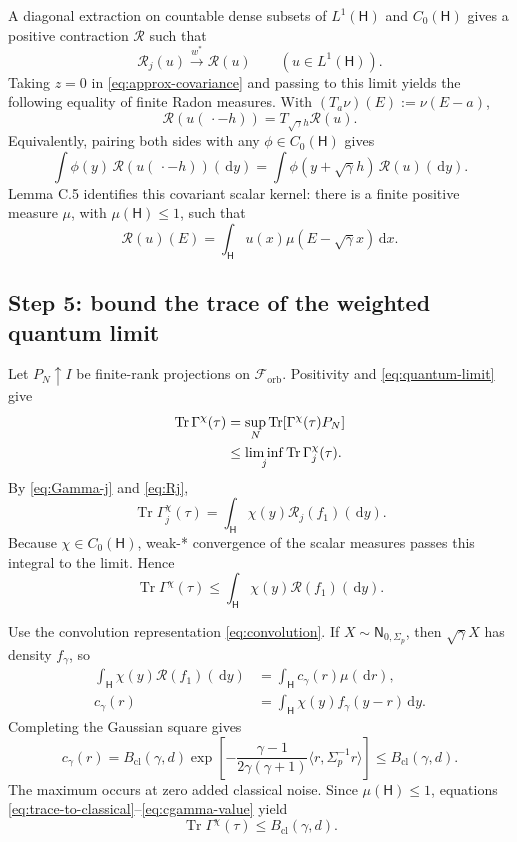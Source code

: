 \documentclass[11pt]{article}
\newcommand{\Hc}{\mathsf H}
\newcommand{\F}{\mathcal F_{\mathrm{orb}}}
\newcommand{\Tr}{\operatorname{Tr}}
\newcommand{\dd}{\,\mathrm d}
\newcommand{\Bcl}{B_{\mathrm{cl}}}
\begin{document}
A diagonal extraction on countable dense subsets of $L^1(\Hc)$ and
$C_0(\Hc)$ gives a positive contraction $\mathcal R$ such that
\[
  \mathcal R_j(u)\stackrel{w^*}{\longrightarrow}\mathcal R(u)
  \qquad(u\in L^1(\Hc)).
\]
Taking $z=0$ in \eqref{eq:approx-covariance} and passing to this limit yields
the following equality of finite Radon measures.  With
$(T_a\nu)(E):=\nu(E-a)$,
\begin{equation}\label{eq:R-covariance}
  \mathcal R(u(\,\cdot-h))
  =T_{\sqrt\gamma h}\mathcal R(u).
\end{equation}
Equivalently, pairing both sides with any $\phi\in C_0(\Hc)$ gives
\[
  \int\phi(y)\,\mathcal R(u(\,\cdot-h))(\dd y)
  =\int\phi(y+\sqrt\gamma h)\,\mathcal R(u)(\dd y).
\]
Lemma C.5 identifies this covariant scalar kernel: there is a finite positive
measure $\mu$, with $\mu(\Hc)\leq1$, such that
\begin{equation}\label{eq:convolution}
  \mathcal R(u)(E)
  =\int_{\Hc}u(x)\mu(E-\sqrt\gamma x)\dd x.
\end{equation}

\subsection*{Step 5: bound the trace of the weighted quantum limit}

Let $P_N\uparrow I$ be finite-rank projections on $\F$.  Positivity and
\eqref{eq:quantum-limit} give
\begin{align}
  \Tr\Gamma^\chi(\tau)
  &=\sup_N\Tr[\Gamma^\chi(\tau)P_N]\notag\\
  &\leq\liminf_j\Tr\Gamma_j^\chi(\tau).
  \label{eq:trace-liminf}
\end{align}
By \eqref{eq:Gamma-j} and \eqref{eq:Rj},
\[
  \Tr\Gamma_j^\chi(\tau)
  =\int_{\Hc}\chi(y)\mathcal R_j(f_1)(\dd y).
\]
Because $\chi\in C_0(\Hc)$, weak-* convergence of the scalar measures passes
this integral to the limit.  Hence
\begin{equation}\label{eq:trace-to-classical}
  \Tr\Gamma^\chi(\tau)
  \leq\int_{\Hc}\chi(y)\mathcal R(f_1)(\dd y).
\end{equation}

Use the convolution representation \eqref{eq:convolution}.  If
$X\sim\mathsf N_{0,\Sigma_p}$, then $\sqrt\gamma X$ has density $f_\gamma$,
so
\begin{align}
  \int_{\Hc}\chi(y)\mathcal R(f_1)(\dd y)
  &=\int_{\Hc}c_\gamma(r)\mu(\dd r),
  \label{eq:cgamma-average}\\
  c_\gamma(r)
  &=\int_{\Hc}\chi(y)f_\gamma(y-r)\dd y.
  \label{eq:cgamma}
\end{align}
Completing the Gaussian square gives
\begin{equation}\label{eq:cgamma-value}
  c_\gamma(r)
  =\Bcl(\gamma,d)
  \exp\!\left[-\frac{\gamma-1}{2\gamma(\gamma+1)}
    \langle r,\Sigma_p^{-1}r\rangle\right]
  \leq\Bcl(\gamma,d).
\end{equation}
The maximum occurs at zero added classical noise.  Since
$\mu(\Hc)\leq1$, equations
\eqref{eq:trace-to-classical}--\eqref{eq:cgamma-value} yield
\begin{equation}\label{eq:trace-bound}
  \Tr\Gamma^\chi(\tau)\leq\Bcl(\gamma,d).
\end{equation}
\end{document}
